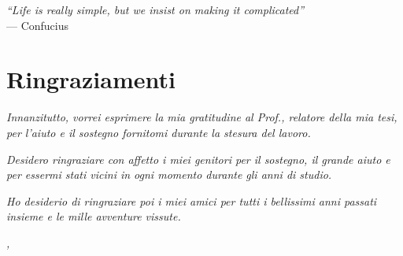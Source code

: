 \cleardoublepage
{}
{}

\begin{flushright}{
    \slshape
    ``Life is really simple, but we insist on making it complicated''} \\
    \medskip
    --- Confucius
\end{flushright}


\bigskip

\begingroup
\let\clearpage\relax
\let\cleardoublepage\relax
\let\cleardoublepage\relax

\chapter*{Ringraziamenti}

\noindent \textit{Innanzitutto, vorrei esprimere la mia gratitudine al Prof.\myProf, relatore della mia tesi, per l'aiuto e il sostegno fornitomi durante la stesura del lavoro.}

\noindent \textit{Desidero ringraziare con affetto i miei genitori per il sostegno, il grande aiuto e per essermi stati vicini in ogni momento durante gli anni di studio.}

\noindent \textit{Ho desiderio di ringraziare poi i miei amici per tutti i bellissimi anni passati insieme e le mille avventure vissute.}
\bigskip

\noindent\textit{\myLocation, \myTime}
\hfill \myName\endgroup
